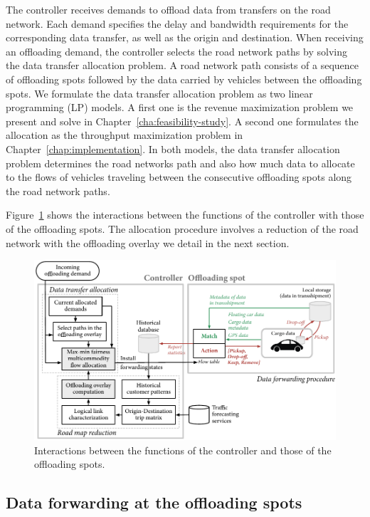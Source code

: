 The controller receives demands to offload data from transfers on the road network. Each demand specifies the delay and bandwidth requirements for the corresponding data transfer, as well as the origin and destination. When receiving an offloading demand, the controller selects the road network paths by solving the data transfer allocation problem. A road network path consists of a sequence of offloading spots followed by the data carried by vehicles between the offloading spots. We formulate the data transfer allocation problem as two linear programming (LP) models. A first one is the revenue maximization problem we present and solve in Chapter~\ref{cha:feasibility-study}. A second one formulates the allocation as the throughput maximization problem in Chapter~\ref{chap:implementation}. In both models, the data transfer allocation problem determines the road networks path and also how much data to allocate to the flows of vehicles traveling between the consecutive offloading spots along the road network paths. 

Figure~\ref{fig:controller-flowchart} shows the interactions between the functions of the controller with those of the offloading spots. The allocation procedure involves a reduction of the road network with the offloading overlay we detail in the next section. 

\begin{figure}[t]
	\centering
		\includegraphics[width=\columnwidth]{figures/controller-flowchart-offloading-spot.pdf}
	\caption{Interactions between the functions of the controller and those of the offloading spots.}
	\label{fig:controller-flowchart}
\end{figure}


\subsection{Data forwarding at the offloading spots}
\label{sec:data-forwarding-offloading-spot}

